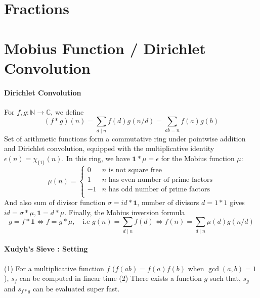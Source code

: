 \section{Fractions}


\section{Mobius Function / Dirichlet Convolution}
\paragraph{Dirichlet Convolution}
For $f, g : \mathbb{N} \to \mathbb{C}$, we define 
$$(f * g)(n) = \sum_{d \mid n} f(d) g(n / d) = \sum_{ab = n} f(a)g(b)$$  
Set of arithmetic functions form a commutative ring under pointwise addition and Dirichlet convolution, equipped with the multiplicative identity $\epsilon(n) = \chi_{\{1\}}(n)$. In this ring, we have $\mathbf{1} * \mu = \epsilon$ for the Mobius function $\mu$:
$$
	\mu(n) = \begin{cases} 0 & n \textrm{ is not square free}\\ 1 & n \textrm{ has even number of prime factors}\\ -1 & n \textrm{ has odd number of prime factors}\\\end{cases}
$$
And also sum of divisor function $\sigma = id * \mathbf{1}$, number of divisors $d = 1 * 1$ gives $id = \sigma * \mu, \mathbf{1} = d * \mu$. 
Finally, the Mobius inversion formula 
$$g = f * \mathbf{1} \iff f = g * \mu, \quad \text{i.e } g(n) = \sum_{d \mid n} f(d) \iff f(n) = \sum_{d \mid n} \mu(d)g(n/d)$$
\paragraph{Xudyh's Sieve : Setting}
(1) For a multiplicative function $f$ ($f(ab) = f(a)f(b)$ when $\gcd(a, b) = 1$), $s_f$ can be computed in linear time
(2) There exists a function $g$ such that, $s_g$ and $s_{f * g}$ can be evaluated super fast. 

